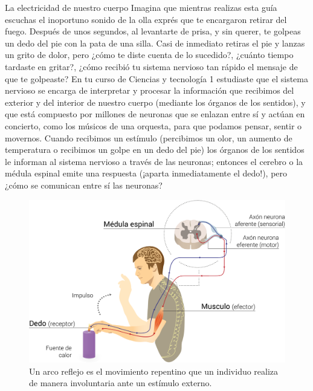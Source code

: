 \begin{sectionbox}{La electricidad de nuestro cuerpo}
    Imagina que mientras realizas esta guía escuchas el inoportuno sonido de la olla exprés
    que te encargaron retirar del fuego. Después de unos segundos, al levantarte de
    prisa, y sin querer, te golpeas un dedo del pie con la pata de una silla. Casi de inmediato retiras el pie y lanzas un grito de dolor, pero ¿cómo te diste cuenta de lo
    sucedido?, ¿cuánto tiempo tardaste en gritar?, ¿cómo recibió tu sistema nervioso
    tan rápido el mensaje de que te golpeaste?
    En tu curso de Ciencias y tecnología 1 estudiaste que el sistema nervioso se encarga de interpretar y procesar la información que recibimos del exterior y del
    interior de nuestro cuerpo (mediante los órganos de los sentidos), y que está compuesto por millones de neuronas que se enlazan entre sí y actúan en concierto,
    como los músicos de una orquesta, para que podamos pensar, sentir o movernos.
    Cuando recibimos un estímulo (percibimos un olor, un aumento de temperatura o
    recibimos un golpe en un dedo del pie) los órganos de los sentidos le informan al sistema nervioso a través de las neuronas; entonces el cerebro o la médula espinal emite
    una respuesta (¡aparta inmediatamente el dedo!), pero ¿cómo se comunican entre sí
    las neuronas?

    \begin{figure}[H]
        \centering
        \includegraphics[width=0.8\linewidth]{../images/arcoreflejo}
        \caption{Un arco reflejo es el movimiento repentino que un individuo realiza de manera involuntaria ante un estímulo externo.}
        \label{fig:arcoreflejo}
    \end{figure}
    
\end{sectionbox}
